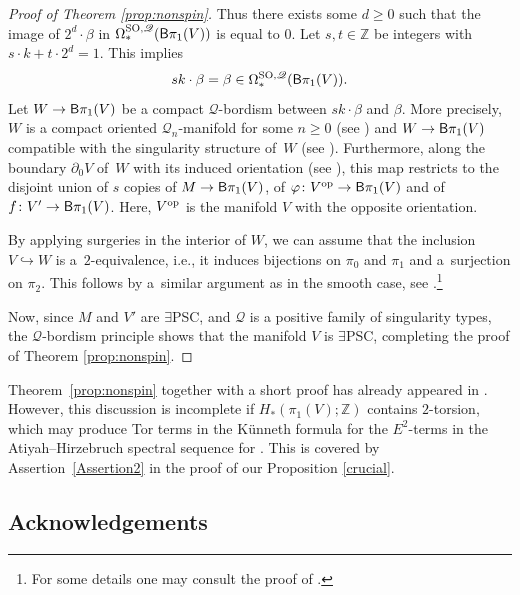 \documentclass[10pt,a4paper]{amsart}
\numberwithin{equation}{section}
\newcommand{\Z}{\mathbb{Z}}
\newcommand{\SO}{\mathrm{SO}}
\newcommand{\sB}{{\sf B}}
\newcommand{\yes}{{\color {blue!70!black}$\exists$}{\sf PSC}}
\begin{document}
\begin{proof}[Proof of Theorem \ref{prop:nonspin}]
Thus there exists some $d \geq 0$ such that the image of $2^d \cdot \beta$ in $\Omega^{\SO, \mathscr{Q}}_*( \sB \pi_1(V))$ is equal to $0$.
Let $s, t \in \Z$ be integers with $s \cdot k + t \cdot 2^d = 1$.
This implies
\[
 s k \cdot \beta = \beta \in \Omega^{\SO, \mathscr{Q}}_*( \sB \pi_1(V)) .
\]
Let $W \to \sB \pi_1(V)$ be a compact $\mathscr{Q}$-bordism between $s k \cdot \beta $ and $\beta$.
More precisely, $W$ is a compact oriented $\mathscr{Q}_n$-manifold for some $n \geq 0$ (see \cite[p.\ 503]{Han20}) and $W \to \sB \pi_1(V)$ compatible with the singularity structure of~$W$ (see \cite[Definition 2.3]{Han20}).
Furthermore, along the boundary $\partial_0 V$ of~$W$ with its induced orientation (see \cite[Definition 2.1]{Han20}), this map restricts to the disjoint union of $s$ copies of $M \to \sB \pi_1(V)$, of $\varphi \colon V^{\rm op}\to \sB \pi_1(V)$ and of $f \colon V' \to \sB \pi_1(V)$.
Here, $V^{\rm op}$ is the manifold $V$ with the opposite orientation.

By applying surgeries in the interior of $W$, we can assume that the inclusion $V \hookrightarrow W$ is a~$2$-equivalence, i.e., it induces bijections on $\pi_0$ and $\pi_1$ and a~surjection on $\pi_2$.
This follows by a~similar argument as in the smooth case, see \cite[Theorem 1.5]{R-S1995}.\footnote{For some details one may consult the proof of \cite[Proposition 3.1]{SchickZenobi}.}

Now, since $M$ and $V'$ are \yes, and $\mathscr{Q}$ is a positive family of singularity types, the $\mathscr{Q}$-bordism principle \cite[Proposition 3.11]{Han20} shows that the manifold $V$ is \yes, completing the proof of Theorem \ref{prop:nonspin}.
\end{proof}

\begin{Remark} Theorem~\ref{prop:nonspin} together with a short proof has already appeared in \cite[Theorem~4.11]{RS}.
However, this discussion is incomplete if $H_*(\pi_1(V); \Z)$ contains $2$-torsion, which may produce Tor terms in the K\"unneth formula for the $E^2$-terms \smash{$H_p\big( \sB \pi_1(V) ; \Omega^{\SO}_q\big)_{(2)}$} in the Atiyah--Hirzebruch spectral sequence for \smash{$\Omega^{\SO}_*( \sB \pi_1(V))_{(2)}$}.
This is covered by Assertion~\ref{Assertion2} in the proof of our Proposition \ref{crucial}.
\end{Remark}

\subsection*{Acknowledgements}
\end{document}
